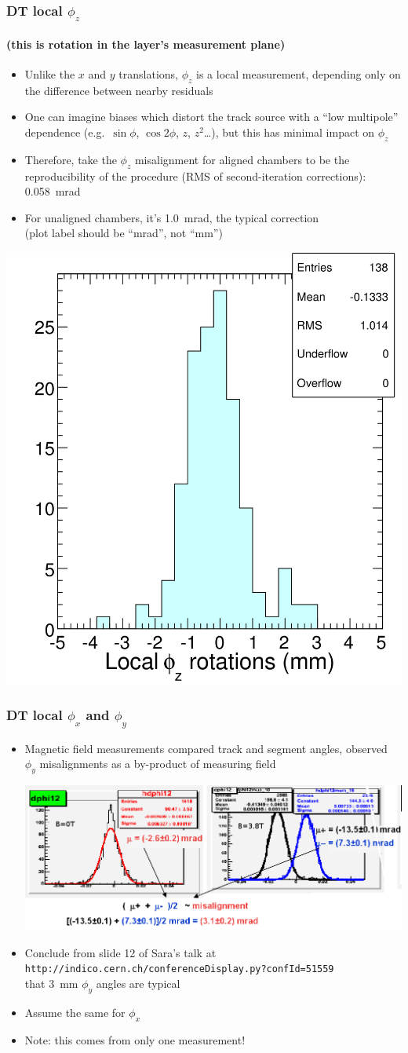 \documentclass[compress]{beamer}
\begin{document}
\begin{frame}
\frametitle{DT local $\phi_z$}
\framesubtitle{(this is rotation in the layer's measurement plane)}
\begin{itemize}
\item Unlike the $x$ and $y$ translations, $\phi_z$ is a local
  measurement, depending only on the difference between nearby
  residuals
\item One can imagine biases which distort the track source with a
  ``low multipole'' dependence (e.g.\ $\sin\phi$, $\cos 2\phi$, $z$,
  $z^2$\ldots), but this has minimal impact on $\phi_z$
\item Therefore, take the $\phi_z$ misalignment for aligned chambers
  to be the reproducibility of the procedure (RMS of second-iteration
  corrections): 0.058~mrad
\item For unaligned chambers, it's 1.0~mrad, the typical correction \\ (plot label should be ``mrad'', not ``mm'')
\end{itemize}

\vspace{-0.8 cm}
\hfill \includegraphics[width=0.3\linewidth]{report2_phiz.png}
\end{frame}

\begin{frame}
\frametitle{DT local $\phi_x$ and $\phi_y$}
\begin{itemize}
\item Magnetic field measurements compared track and segment angles, observed $\phi_y$ misalignments as a by-product of measuring field

\includegraphics[width=\linewidth]{segment_phiy.png}

\item Conclude from slide 12 of Sara's talk at {\tt \scriptsize http://indico.cern.ch/conferenceDisplay.py?confId=51559} \\ that 3~mm $\phi_y$ angles are typical

\item Assume the same for $\phi_x$

\item Note: this comes from only one measurement!
\end{itemize}
\end{frame}
\end{document}
